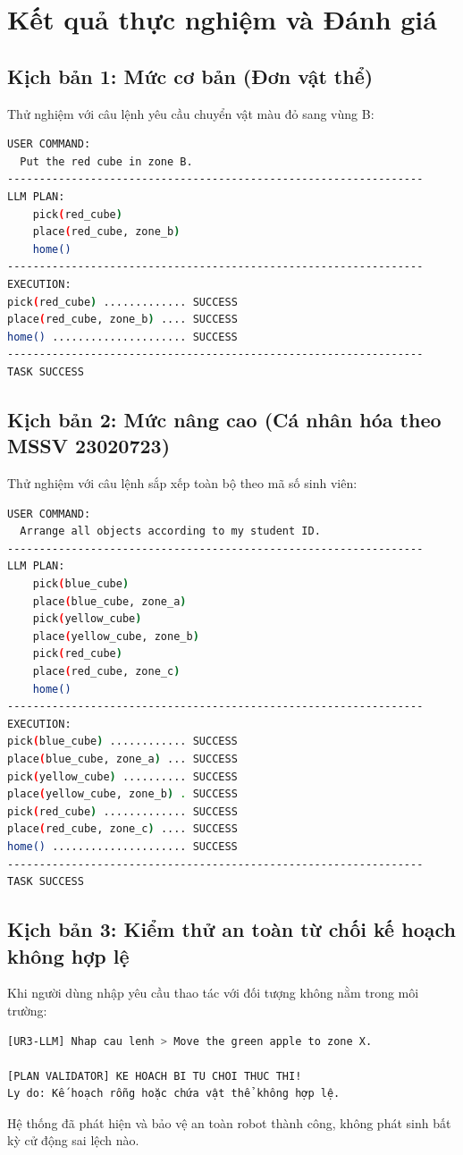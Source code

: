 \documentclass[a4paper,12pt]{article}
\begin{document}
\section{Kết quả thực nghiệm và Đánh giá}

\subsection{Kịch bản 1: Mức cơ bản (Đơn vật thể)}
Thử nghiệm với câu lệnh yêu cầu chuyển vật màu đỏ sang vùng B:
\begin{lstlisting}[language=bash]
USER COMMAND:
  Put the red cube in zone B.
-----------------------------------------------------------------
LLM PLAN:
    pick(red_cube)
    place(red_cube, zone_b)
    home()
-----------------------------------------------------------------
EXECUTION:
pick(red_cube) ............. SUCCESS
place(red_cube, zone_b) .... SUCCESS
home() ..................... SUCCESS
-----------------------------------------------------------------
TASK SUCCESS
\end{lstlisting}

\subsection{Kịch bản 2: Mức nâng cao (Cá nhân hóa theo MSSV 23020723)}
Thử nghiệm với câu lệnh sắp xếp toàn bộ theo mã số sinh viên:
\begin{lstlisting}[language=bash]
USER COMMAND:
  Arrange all objects according to my student ID.
-----------------------------------------------------------------
LLM PLAN:
    pick(blue_cube)
    place(blue_cube, zone_a)
    pick(yellow_cube)
    place(yellow_cube, zone_b)
    pick(red_cube)
    place(red_cube, zone_c)
    home()
-----------------------------------------------------------------
EXECUTION:
pick(blue_cube) ............ SUCCESS
place(blue_cube, zone_a) ... SUCCESS
pick(yellow_cube) .......... SUCCESS
place(yellow_cube, zone_b) . SUCCESS
pick(red_cube) ............. SUCCESS
place(red_cube, zone_c) .... SUCCESS
home() ..................... SUCCESS
-----------------------------------------------------------------
TASK SUCCESS
\end{lstlisting}

\subsection{Kịch bản 3: Kiểm thử an toàn từ chối kế hoạch không hợp lệ}
Khi người dùng nhập yêu cầu thao tác với đối tượng không nằm trong môi trường:
\begin{lstlisting}[language=bash]
[UR3-LLM] Nhap cau lenh > Move the green apple to zone X.

[PLAN VALIDATOR] KE HOACH BI TU CHOI THUC THI!
Ly do: Kế hoạch rỗng hoặc chứa vật thể không hợp lệ.
\end{lstlisting}
Hệ thống đã phát hiện và bảo vệ an toàn robot thành công, không phát sinh bất kỳ cử động sai lệch nào.
\end{document}
